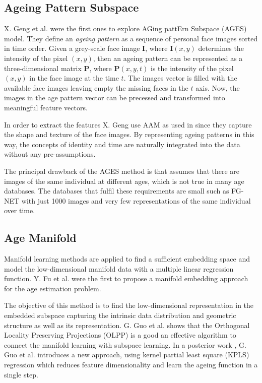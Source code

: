 \subsection{Ageing Pattern Subspace}\label{subsec:APS}

X. Geng et al. \cite{4359348, Geng:2006:LFA:1180639.1180711} were the first ones to explore AGing pattErn Subspace (AGES) model. They define an \textit{ageing pattern} as a sequence of personal face images sorted in time order. Given a grey-scale face image $\textbf{I}$, where $\textbf{I}(x,y)$ determines the intensity of the pixel $(x,y)$, then an ageing pattern can be represented as a three-dimensional matrix $\textbf{P}$, where $\textbf{P}(x,y,t)$ is the intensity of the pixel $(x,y)$ in the face image at the time $t$. The images vector is filled with the available face images leaving empty the missing faces in the $t$ axis. Now, the images in the age pattern vector can be precessed and transformed into meaningful feature vectors.

In order to extract the features X. Geng use AAM as used in \cite{791208} since they capture the shape and texture of the face images. By representing ageing patterns in this way, the concepts of identity and time are naturally integrated into the data without any pre-assumptions.

The principal drawback of the AGES method is that assumes that there are images of the same individual at different ages, which is not true in many age databases. The databases that fulfil these requirements are small such as FG-NET \cite{FGNET} with just 1000 images and very few representations of the same individual over time.

\subsection{Age Manifold}\label{subsec:manifold}
 
Manifold learning methods are applied to find a sufficient embedding space and model the low-dimensional manifold data with a multiple linear regression function. Y. Fu et al. \cite{4523958, 4284917} were the first to propose a manifold embedding approach for the age estimation problem. 

The objective of this method is to find the low-dimensional representation in the embedded subspace capturing the intrinsic data distribution and geometric structure as well as its representation. G. Guo et al. \cite{Guo:2008:IHA:2319085.2321608} \cite{4531189} shows that the Orthogonal Locality Preserving Projections (OLPP) \cite{CHHZ06}  is a good an effective algorithm  to connect the manifold learning with subspace learning. In a posterior work \cite{5995404}, G. Guo et al. introduces a new approach, using kernel partial least square (KPLS) regression which reduces feature dimensionality and learn the ageing function in a single step.

